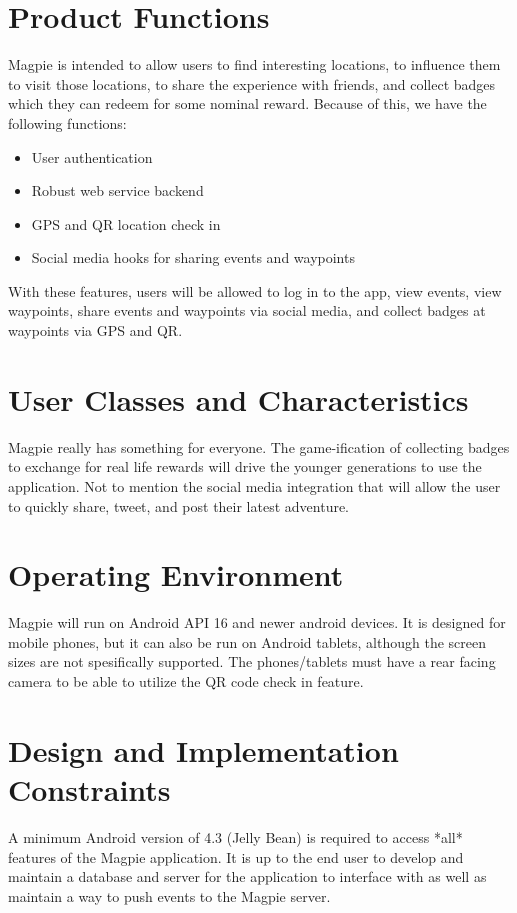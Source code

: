 \documentclass{scrreprt}
\begin{document}
\section{Product Functions}
Magpie is intended to allow users to find interesting locations, to influence them
to visit those locations, to share the experience with friends, and collect badges
which they can redeem for some nominal reward. Because of this, we have the
following functions:
\begin{itemize}
\item User authentication
\item Robust web service backend
\item GPS and QR location check in
\item Social media hooks for sharing events and waypoints
\end{itemize}
With these features, users will be allowed to log in to the app, view events,
view waypoints, share events and waypoints via social media, and collect
badges at waypoints via GPS and QR.

\section{User Classes and Characteristics}
Magpie really has something for everyone. The game-ification of collecting badges to
exchange for real life rewards will drive the younger generations to use the application.
Not to mention the social media integration that will allow the user to quickly share, tweet, and
post their latest adventure.

\section{Operating Environment}
Magpie will run on Android API 16 and newer android devices. It is designed for
mobile phones, but it can also be run on Android tablets, although the screen
sizes are not spesifically supported. The phones/tablets must have a rear facing
camera to be able to utilize the QR code check in feature.

\section{Design and Implementation Constraints}
A minimum Android version of 4.3 (Jelly Bean) is required to access *all* features of the Magpie application. It is up to the end user to develop and maintain a database and server for the application to interface with as well as maintain a way to push events to the Magpie server.
\end{document}
